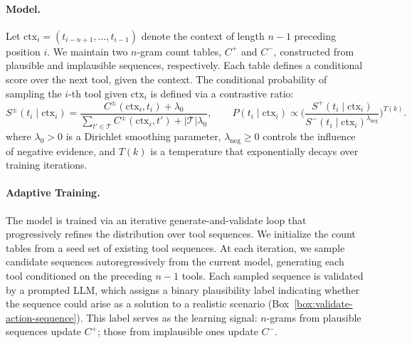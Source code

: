 \paragraph{Model.} Let $\text{ctx}_i=(t_{i-n+1},\ldots,t_{i-1})$ denote the context of length $n{-}1$ preceding position $i$. We maintain two $n$-gram count tables, $C^+$ and $C^-$, constructed from plausible and implausible sequences, respectively. Each table defines a conditional score over the next tool, given the context. The conditional probability of sampling the $i$-th tool given $\text{ctx}_i$ is defined via a contrastive ratio:
\begin{equation*}
S^{\pm}(t_i \mid \text{ctx}_i)
=
\frac{C^{\pm}(\text{ctx}_i,t_i)+\lambda_0}
{\sum_{t' \in \mathcal{T}} C^{\pm}(\text{ctx}_i,t') + |\mathcal{T}|\lambda_0}, 
\qquad 
P(t_i \mid \text{ctx}_i) \propto 
\Bigg(\frac{S^+(t_i \mid \text{ctx}_i)}
{S^-(t_i \mid \text{ctx}_i)^{\lambda_{\text{neg}}}}\Bigg)^{T(k)}.
\end{equation*}
where $\lambda_0>0$ is a Dirichlet smoothing parameter, $\lambda_{\text{neg}}\ge 0$ controls the influence of negative evidence, and $T(k)$ is a temperature that exponentially decays over training iterations.

\paragraph{Adaptive Training.} The model is trained via an iterative generate-and-validate loop that progressively refines the distribution over tool sequences. We initialize the count tables from a seed set of existing tool sequences. At each iteration, we sample candidate sequences autoregressively from the current model, generating each tool conditioned on the preceding $n{-}1$ tools. Each sampled sequence is validated by a prompted LLM, which assigns a binary plausibility label indicating whether the sequence could arise as a solution to a realistic scenario (Box~\ref{box:validate-action-sequence}). This label serves as the learning signal: $n$-grams from plausible sequences update $C^+$; those from implausible ones update $C^-$.

